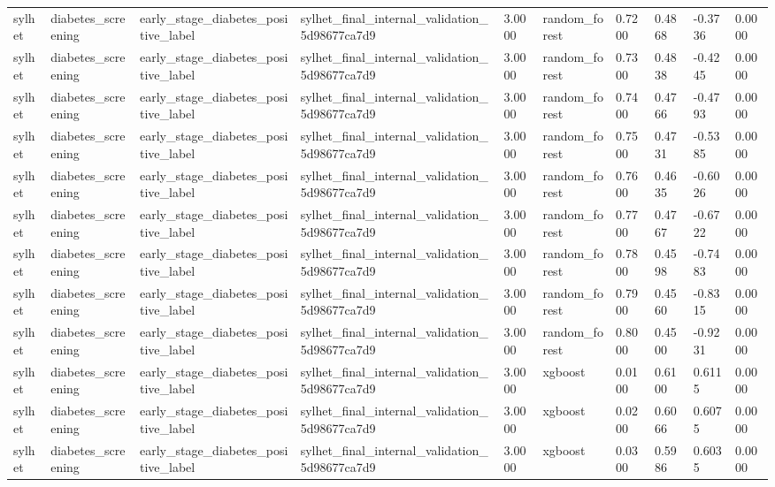 \begin{tabular}{llllllllll}
sylhet & diabetes\_screening & early\_stage\_diabetes\_positive\_label & sylhet\_final\_internal\_validation\_5d98677ca7d9 & 3.0000 & random\_forest & 0.7200 & 0.4868 & -0.3736 & 0.0000 \\
sylhet & diabetes\_screening & early\_stage\_diabetes\_positive\_label & sylhet\_final\_internal\_validation\_5d98677ca7d9 & 3.0000 & random\_forest & 0.7300 & 0.4838 & -0.4245 & 0.0000 \\
sylhet & diabetes\_screening & early\_stage\_diabetes\_positive\_label & sylhet\_final\_internal\_validation\_5d98677ca7d9 & 3.0000 & random\_forest & 0.7400 & 0.4766 & -0.4793 & 0.0000 \\
sylhet & diabetes\_screening & early\_stage\_diabetes\_positive\_label & sylhet\_final\_internal\_validation\_5d98677ca7d9 & 3.0000 & random\_forest & 0.7500 & 0.4731 & -0.5385 & 0.0000 \\
sylhet & diabetes\_screening & early\_stage\_diabetes\_positive\_label & sylhet\_final\_internal\_validation\_5d98677ca7d9 & 3.0000 & random\_forest & 0.7600 & 0.4635 & -0.6026 & 0.0000 \\
sylhet & diabetes\_screening & early\_stage\_diabetes\_positive\_label & sylhet\_final\_internal\_validation\_5d98677ca7d9 & 3.0000 & random\_forest & 0.7700 & 0.4767 & -0.6722 & 0.0000 \\
sylhet & diabetes\_screening & early\_stage\_diabetes\_positive\_label & sylhet\_final\_internal\_validation\_5d98677ca7d9 & 3.0000 & random\_forest & 0.7800 & 0.4598 & -0.7483 & 0.0000 \\
sylhet & diabetes\_screening & early\_stage\_diabetes\_positive\_label & sylhet\_final\_internal\_validation\_5d98677ca7d9 & 3.0000 & random\_forest & 0.7900 & 0.4560 & -0.8315 & 0.0000 \\
sylhet & diabetes\_screening & early\_stage\_diabetes\_positive\_label & sylhet\_final\_internal\_validation\_5d98677ca7d9 & 3.0000 & random\_forest & 0.8000 & 0.4500 & -0.9231 & 0.0000 \\
sylhet & diabetes\_screening & early\_stage\_diabetes\_positive\_label & sylhet\_final\_internal\_validation\_5d98677ca7d9 & 3.0000 & xgboost & 0.0100 & 0.6100 & 0.6115 & 0.0000 \\
sylhet & diabetes\_screening & early\_stage\_diabetes\_positive\_label & sylhet\_final\_internal\_validation\_5d98677ca7d9 & 3.0000 & xgboost & 0.0200 & 0.6066 & 0.6075 & 0.0000 \\
sylhet & diabetes\_screening & early\_stage\_diabetes\_positive\_label & sylhet\_final\_internal\_validation\_5d98677ca7d9 & 3.0000 & xgboost & 0.0300 & 0.5986 & 0.6035 & 0.0000 \\

\end{tabular}

